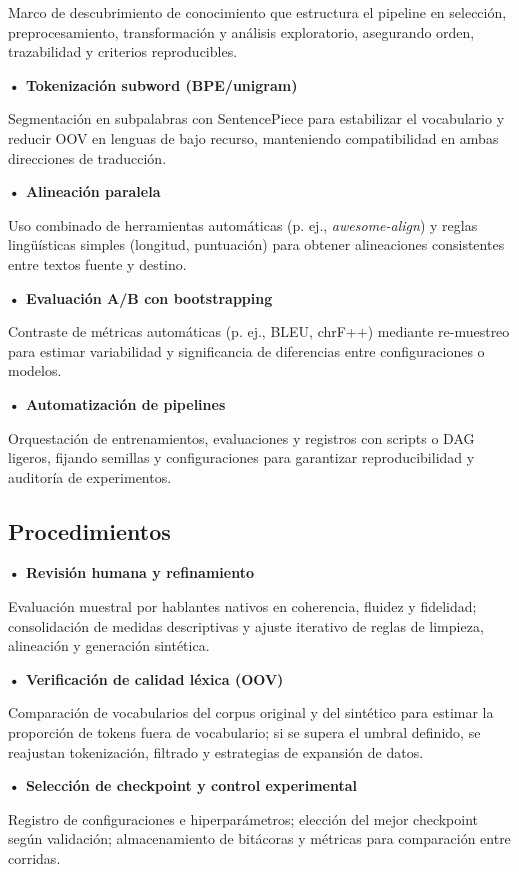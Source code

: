 \documentclass[12pt,a4paper,oneside]{book}
\begin{document}
Marco de descubrimiento de conocimiento que estructura el pipeline en selección, preprocesamiento, transformación y análisis exploratorio, asegurando orden, trazabilidad y criterios reproducibles.

\textbf{• Tokenización subword (BPE/unigram)}

Segmentación en subpalabras con SentencePiece para estabilizar el vocabulario y reducir OOV en lenguas de bajo recurso, manteniendo compatibilidad en ambas direcciones de traducción.

\textbf{• Alineación paralela}

Uso combinado de herramientas automáticas (p. ej., \emph{awesome-align}) y reglas lingüísticas simples (longitud, puntuación) para obtener alineaciones consistentes entre textos fuente y destino.

\textbf{• Evaluación A/B con bootstrapping}

Contraste de métricas automáticas (p. ej., BLEU, chrF++) mediante re-muestreo para estimar variabilidad y significancia de diferencias entre configuraciones o modelos.

\textbf{• Automatización de pipelines}

Orquestación de entrenamientos, evaluaciones y registros con scripts o DAG ligeros, fijando semillas y configuraciones para garantizar reproducibilidad y auditoría de experimentos.

\subsection{Procedimientos}\label{procedimientos}

\textbf{• Revisión humana y refinamiento}

Evaluación muestral por hablantes nativos en coherencia, fluidez y fidelidad; consolidación de medidas descriptivas y ajuste iterativo de reglas de limpieza, alineación y generación sintética.

\textbf{• Verificación de calidad léxica (OOV)}

Comparación de vocabularios del corpus original y del sintético para estimar la proporción de tokens fuera de vocabulario; si se supera el umbral definido, se reajustan tokenización, filtrado y estrategias de expansión de datos.

\textbf{• Selección de checkpoint y control experimental}

Registro de configuraciones e hiperparámetros; elección del mejor checkpoint según validación; almacenamiento de bitácoras y métricas para comparación entre corridas.
\end{document}
